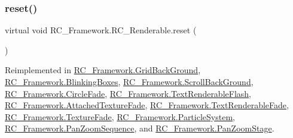 \subsubsection{\texorpdfstring{reset()}{reset()}}
{\footnotesize\ttfamily virtual void R\+C\+\_\+\+Framework.\+R\+C\+\_\+\+Renderable.\+reset (\begin{DoxyParamCaption}{ }\end{DoxyParamCaption})\hspace{0.3cm}{\ttfamily [virtual]}}



Reimplemented in \mbox{\hyperlink{class_r_c___framework_1_1_grid_back_ground_aeaa4759b7da2f73fd760f0e9d59aa97c}{R\+C\+\_\+\+Framework.\+Grid\+Back\+Ground}}, \mbox{\hyperlink{class_r_c___framework_1_1_blinking_boxes_a2120dce99476eb2e086063a004acfd90}{R\+C\+\_\+\+Framework.\+Blinking\+Boxes}}, \mbox{\hyperlink{class_r_c___framework_1_1_scroll_back_ground_aeb2e92fd02bce76a76d4002aa94ff3d5}{R\+C\+\_\+\+Framework.\+Scroll\+Back\+Ground}}, \mbox{\hyperlink{class_r_c___framework_1_1_circle_fade_a7dd68138bc5eb6e9e6f2d031d9091a8a}{R\+C\+\_\+\+Framework.\+Circle\+Fade}}, \mbox{\hyperlink{class_r_c___framework_1_1_text_renderable_flash_a5caaf89017eb8df59bffaba6421b7b2e}{R\+C\+\_\+\+Framework.\+Text\+Renderable\+Flash}}, \mbox{\hyperlink{class_r_c___framework_1_1_attached_texture_fade_ad5760d7529afe100e6dd7fbe4ecc7b38}{R\+C\+\_\+\+Framework.\+Attached\+Texture\+Fade}}, \mbox{\hyperlink{class_r_c___framework_1_1_text_renderable_fade_ab37a0a521d74ac2b706023c5a0fc73ab}{R\+C\+\_\+\+Framework.\+Text\+Renderable\+Fade}}, \mbox{\hyperlink{class_r_c___framework_1_1_texture_fade_acd92f3d9604d6178ba52fb82a09967c5}{R\+C\+\_\+\+Framework.\+Texture\+Fade}}, \mbox{\hyperlink{class_r_c___framework_1_1_particle_system_ac96aa1743b45944d102ddf01d67452c1}{R\+C\+\_\+\+Framework.\+Particle\+System}}, \mbox{\hyperlink{class_r_c___framework_1_1_pan_zoom_sequence_ab235ec7298062b4e3a028979c5abad5c}{R\+C\+\_\+\+Framework.\+Pan\+Zoom\+Sequence}}, and \mbox{\hyperlink{class_r_c___framework_1_1_pan_zoom_stage_a9dc8dc75dab537e608713543ca314284}{R\+C\+\_\+\+Framework.\+Pan\+Zoom\+Stage}}.

\mbox{\label{class_r_c___framework_1_1_r_c___renderable_a21e5b1a68c7382443c82e7296fd2209a}} 
